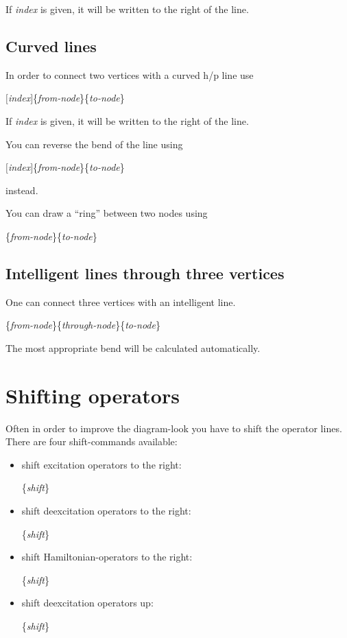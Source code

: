 \documentclass[a4paper]{article}
\newcommand{\myind}{\hspace{10pt}}
\begin{document}
If {\it index} is given, it will be written to the right of the line.

\subsection{Curved lines}

In order to connect two vertices with a curved h/p line use

\myind{\bf \textbackslash dcurve}$[${\it index}$]$\{{\it from-node}\}\{{\it to-node}\}

If {\it index} is given, it will be written to the right of the line.

You can reverse the bend of the line using 

\myind{\bf \textbackslash dcurver}$[${\it index}$]$\{{\it from-node}\}\{{\it to-node}\}

instead.

You can draw a ``ring'' between two nodes using

\myind{\bf \textbackslash dcurcur}\{{\it from-node}\}\{{\it to-node}\}

\subsection{Intelligent lines through three vertices}

One can connect three vertices with an intelligent line. 

\myind{\bf \textbackslash dcurt}\{{\it from-node}\}\{{\it through-node}\}\{{\it to-node}\}

The most appropriate bend will be calculated automatically.

\section{Shifting operators}

Often in order to improve the diagram-look you have to shift the operator lines.
There are four shift-commands available:
\begin{itemize}
 \item shift excitation operators to the right:

\myind{\bf \textbackslash dmoveT}\{{\it shift}\}

 \item  shift deexcitation operators to the right:

\myind{\bf \textbackslash dmoveTd}\{{\it shift}\}

 \item  shift Hamiltonian-operators to the right:

\myind{\bf \textbackslash dmoveH}\{{\it shift}\}

  \item  shift deexcitation operators up:

\myind{\bf \textbackslash dmovac}\{{\it shift}\}
\end{itemize}
\end{document}
